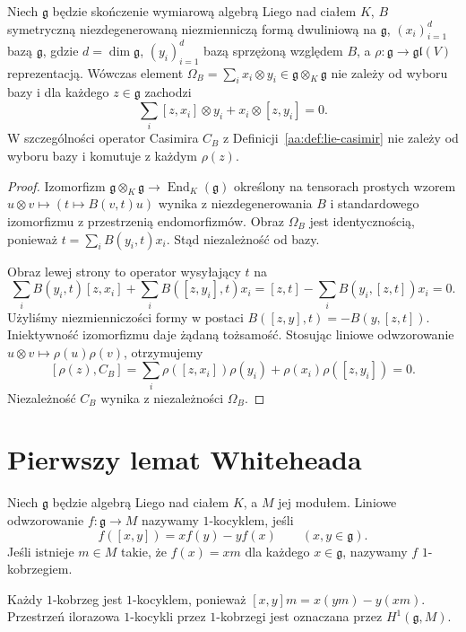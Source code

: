 \begin{lemat}
\label{aa:lem:lie-casimir-identity}
Niech $\mathfrak g$ będzie skończenie wymiarową algebrą Liego nad ciałem $K$, $B$ symetryczną niezdegenerowaną niezmienniczą formą dwuliniową na $\mathfrak g$, $(x_i)_{i=1}^d$ bazą $\mathfrak g$, gdzie $d=\dim\mathfrak g$, $(y_i)_{i=1}^d$ bazą sprzężoną względem $B$, a $\rho:\mathfrak g\to\mathfrak{gl}(V)$ reprezentacją. Wówczas element $\Omega_B=\sum_i x_i\otimes y_i\in\mathfrak g\otimes_K\mathfrak g$ nie zależy od wyboru bazy i dla każdego $z\in\mathfrak g$ zachodzi
\[
 \sum_i [z,x_i]\otimes y_i+x_i\otimes[z,y_i]=0.
\]
W szczególności operator Casimira $C_B$ z Definicji~\ref{aa:def:lie-casimir} nie zależy od wyboru bazy i komutuje z każdym $\rho(z)$.
\end{lemat}
\begin{proof}
Izomorfizm $\mathfrak g\otimes_K\mathfrak g\to\operatorname{End}_K(\mathfrak g)$ określony na tensorach prostych wzorem $u\otimes v\mapsto (t\mapsto B(v,t)u)$ wynika z niezdegenerowania $B$ i standardowego izomorfizmu z przestrzenią endomorfizmów. Obraz $\Omega_B$ jest identycznością, ponieważ $t=\sum_i B(y_i,t)x_i$. Stąd niezależność od bazy.

Obraz lewej strony to operator wysyłający $t$ na
\[
 \sum_i B(y_i,t)[z,x_i]+\sum_i B([z,y_i],t)x_i
 =[z,t]-\sum_i B(y_i,[z,t])x_i=0.
\]
Użyliśmy niezmienniczości formy w postaci $B([z,y],t)=-B(y,[z,t])$. Iniektywność izomorfizmu daje żądaną tożsamość. Stosując liniowe odwzorowanie $u\otimes v\mapsto\rho(u)\rho(v)$, otrzymujemy
\[
 [\rho(z),C_B]=\sum_i\rho([z,x_i])\rho(y_i)+
 \rho(x_i)\rho([z,y_i])=0.
\]
Niezależność $C_B$ wynika z niezależności $\Omega_B$.
\end{proof}

\section{Pierwszy lemat Whiteheada}

\begin{definicja}
\label{aa:def:lie-one-cocycle}
Niech $\mathfrak g$ będzie algebrą Liego nad ciałem $K$, a $M$ jej modułem. Liniowe odwzorowanie $f:\mathfrak g\to M$ nazywamy $1$-kocyklem, jeśli
\[
 f([x,y])=xf(y)-yf(x)\qquad(x,y\in\mathfrak g).
\]
Jeśli istnieje $m\in M$ takie, że $f(x)=xm$ dla każdego $x\in\mathfrak g$, nazywamy $f$ $1$-kobrzegiem.
\end{definicja}

Każdy $1$-kobrzeg jest $1$-kocyklem, ponieważ $[x,y]m=x(ym)-y(xm)$. Przestrzeń ilorazowa $1$-kocykli przez $1$-kobrzegi jest oznaczana przez $H^1(\mathfrak g,M)$.


